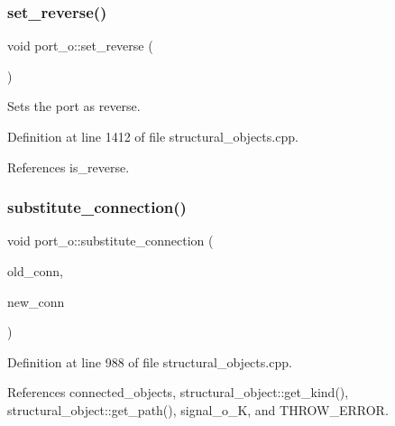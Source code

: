 \subsubsection{\texorpdfstring{set\+\_\+reverse()}{set\_reverse()}}
{\footnotesize\ttfamily void port\+\_\+o\+::set\+\_\+reverse (\begin{DoxyParamCaption}{ }\end{DoxyParamCaption})}



Sets the port as reverse. 



Definition at line 1412 of file structural\+\_\+objects.\+cpp.



References is\+\_\+reverse.

\mbox{\label{structport__o_a3e10db29a011de4d51efb9b3a522479c}} 
\subsubsection{\texorpdfstring{substitute\+\_\+connection()}{substitute\_connection()}}
{\footnotesize\ttfamily void port\+\_\+o\+::substitute\+\_\+connection (\begin{DoxyParamCaption}\item[{\hyperlink{structural__objects_8hpp_a8ea5f8cc50ab8f4c31e2751074ff60b2}{structural\+\_\+object\+Ref}}]{old\+\_\+conn,  }\item[{\hyperlink{structural__objects_8hpp_a8ea5f8cc50ab8f4c31e2751074ff60b2}{structural\+\_\+object\+Ref}}]{new\+\_\+conn }\end{DoxyParamCaption})}



Definition at line 988 of file structural\+\_\+objects.\+cpp.



References connected\+\_\+objects, structural\+\_\+object\+::get\+\_\+kind(), structural\+\_\+object\+::get\+\_\+path(), signal\+\_\+o\+\_\+K, and T\+H\+R\+O\+W\+\_\+\+E\+R\+R\+OR.

